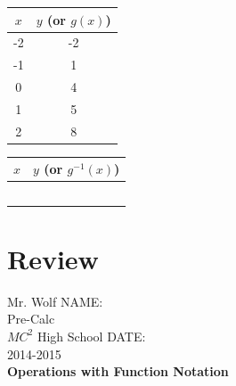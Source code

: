 \documentclass[12pt]{article}
\let\stdsection\section
\renewcommand\section{\newpage\stdsection}
\begin{document}
\begin{multicols}{2}
\begin{center}
	\begin{tabular}{c | c}
	
		\hspace{.5cm}$x$ \hspace{.5cm} & $y$ (or $g(x)$) \\ \hline
	
		-2 & -2\\
		 
		-1 & 1\\
		
		0 & 4 \\
		
		1 & 5 \\
		
		2 & 8 \\
	
	\end{tabular}
	
		\begin{tabular}{c | c}
	
		\hspace{.5cm}$x$\hspace{.5cm} & $y$ (or $g^{-1}(x)$) \\ \hline
		 & \\
		 & \\
		 & \\
		 & \\
		 & \\
		
		
	\end{tabular}

\end{center}
\end{multicols}
 
 

\section{Review}

Mr. Wolf \hfill NAME:\underline{\hspace{3in}}\\ 
Pre-Calc \\ 
$MC^2$ High School \hfill DATE:\underline{\hspace{2in}}\\
2014-2015\\

\textbf{Operations with Function Notation}\\
\end{document}
